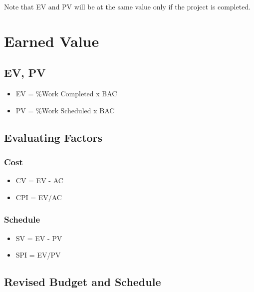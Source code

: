 \documentclass[]{article}
\providecommand{\tightlist}{%
  \setlength{\itemsep}{0pt}\setlength{\parskip}{0pt}}
\begin{document}
Note that EV and PV will be at the same value only if the project is
completed.

\hypertarget{earned-value}{%
\section{Earned Value}\label{earned-value}}

\hypertarget{ev-pv}{%
\subsection{EV, PV}\label{ev-pv}}

\begin{itemize}
\tightlist
\item
  EV = \%Work Completed x BAC
\item
  PV = \%Work Scheduled x BAC
\end{itemize}

\hypertarget{evaluating-factors}{%
\subsection{Evaluating Factors}\label{evaluating-factors}}

\hypertarget{cost}{%
\subsubsection{Cost}\label{cost}}

\begin{itemize}
\tightlist
\item
  CV = EV - AC
\item
  CPI = EV/AC
\end{itemize}

\hypertarget{schedule}{%
\subsubsection{Schedule}\label{schedule}}

\begin{itemize}
\tightlist
\item
  SV = EV - PV
\item
  SPI = EV/PV
\end{itemize}

\hypertarget{revised-budget-and-schedule}{%
\subsection{Revised Budget and
Schedule}\label{revised-budget-and-schedule}}
\end{document}
